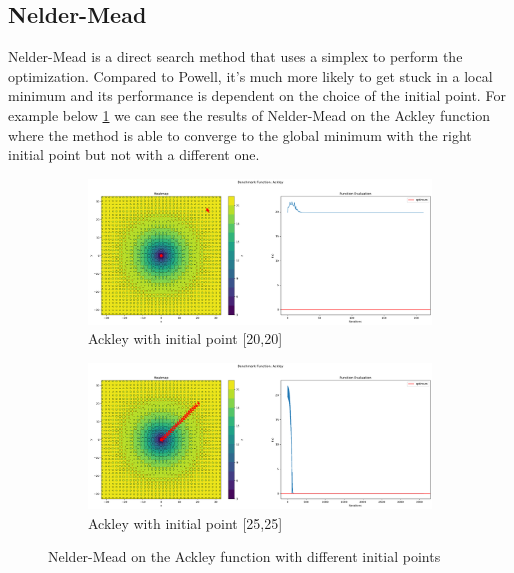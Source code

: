 \subsection{Nelder-Mead}
\label{sec:nelder-mead}
Nelder-Mead is a direct search method that uses a simplex to perform the optimization. Compared to Powell, it's much more likely to get stuck in a local minimum and its performance is dependent on the choice of the initial point. For example below \ref{fig:nm-ackley} we can see the results of Nelder-Mead on the Ackley function where the method is able to converge to the global minimum with the right initial point but not with a different one.
\begin{figure}[H]
    \begin{subfigure}{0.5\textwidth}
        \includegraphics[width=\textwidth]{lab1/imgs/nm_ackley_20.png}
        \caption{Ackley with initial point [20,20]}
    \end{subfigure}
    \begin{subfigure}{0.5\textwidth}
        \includegraphics[width=\textwidth]{lab1/imgs/nm_ackley_25.png}
        \caption{Ackley with initial point [25,25]}
    \end{subfigure}
    \caption{Nelder-Mead on the Ackley function with different initial points}
    \label{fig:nm-ackley}
\end{figure}


